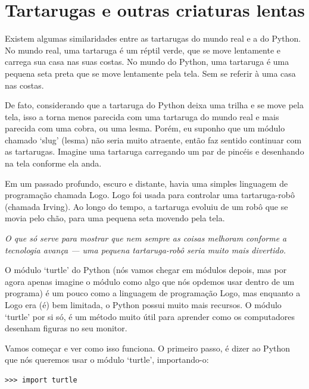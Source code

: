 

\chapter{Tartarugas e outras criaturas lentas}\label{ch:turtles}

Existem algumas similaridades entre as tartarugas do mundo real e a do Python. No mundo real, uma tartaruga é um réptil verde, que se move lentamente e carrega sua casa nas suas costas. No mundo do Python, uma tartaruga é uma pequena seta preta que se move lentamente pela tela. Sem se referir à uma casa nas costas.

De fato, considerando que a tartaruga do Python deixa uma trilha e se move pela tela, isso a torna menos parecida com uma tartaruga do mundo real e mais parecida com uma cobra, ou uma lesma. Porém, eu suponho que um módulo chamado `slug' (lesma) não seria muito atraente, então faz sentido continuar com as tartarugas. Imagine uma tartaruga carregando um par de pincéis e desenhando na tela conforme ela anda.

Em um passado profundo, escuro e distante, havia uma simples linguagem de programação chamada Logo. Logo foi usada para controlar uma tartaruga-robô (chamada Irving). Ao longo do tempo, a tartaruga evoluiu de um robô que se movia pelo chão, para uma pequena seta movendo pela tela.

\emph{O que só serve para mostrar que nem sempre as coisas melhoram conforme a tecnologia avança --- uma pequena tartaruga-robô seria muito mais divertido.}

O módulo `turtle' do Python (nós vamos chegar em módulos depois, mas por agora apenas imagine o módulo como algo que nós opdemos usar dentro de um programa) é um pouco como a linguagem de programação Logo, mas enquanto a Logo era (é) bem limitada, o Python possui muito mais recursos. O módulo `turtle' por si só, é um método muito útil para aprender como os computadores desenham figuras no seu monitor.

Vamos começar e ver como isso funciona. O primeiro passo, é dizer ao Python que nós queremos usar o módulo `turtle', importando-o:

\begin{listing}
\begin{verbatim}
>>> import turtle
\end{verbatim}
\end{listing}

